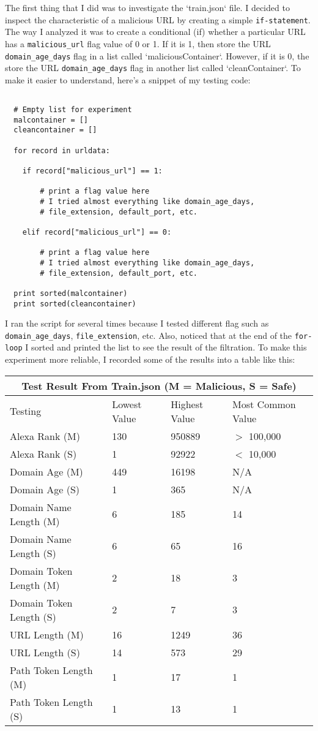 \documentclass[letterpaper,10pt,titlepage,draftclsnofoot,onecolumn]{IEEEtran}
\begin{document}
The first thing that I did was to investigate the `train.json` file.
I decided to inspect the characteristic of a malicious URL by creating a simple \verb|if-statement|.
The way I analyzed it was to create a conditional (if) whether a particular URL has a \verb|malicious_url| flag value of 0 or 1. 
If it is 1, then store the URL \verb|domain_age_days| flag in a list called `maliciousContainer`. 
However, if it is 0, the store the URL \verb|domain_age_days| flag in another list called `cleanContainer`.
To make it easier to understand, here's a snippet of my testing code:
\begin{lstlisting}
 
  # Empty list for experiment 
  malcontainer = []
  cleancontainer = []

  for record in urldata:

    if record["malicious_url"] == 1:
		
		# print a flag value here
		# I tried almost everything like domain_age_days, 
		# file_extension, default_port, etc.
		
    elif record["malicious_url"] == 0:
    
    	# print a flag value here
		# I tried almost everything like domain_age_days, 
		# file_extension, default_port, etc.

  print sorted(malcontainer)
  print sorted(cleancontainer)

\end{lstlisting}

I ran the script for several times because I tested different flag such as \verb|domain_age_days|, \verb|file_extension|, etc. 
Also, noticed that at the end of the \verb|for-loop| I sorted and printed the list to see the result of the filtration.  
To make this experiment more reliable, I recorded some of the results into a table like this: 

\begin{tabular}{ |p{4cm}|p{2cm}|p{2cm}|p{3cm}|  }
 \hline
 \multicolumn{4}{|c|}{Test Result From Train.json (M = Malicious, S = Safe)} \\
 \hline
 Testing & Lowest Value & Highest Value & Most Common Value\\
 \hline 
Alexa Rank (M) & 130 & 950889 & $>$ 100,000 \\
Alexa Rank (S) &	1	& 92922 &	$<$ 10,000 \\
Domain Age (M)	& 449	& 16198	& N/A\\
Domain Age (S)& 1	& 365	& N/A\\
Domain Name Length (M)	& 6	& 185	& 14 \\
Domain Name Length	(S) &6	&65	&16 \\
Domain Token Length (M)	&2	&18	&3 \\
Domain Token Length (S)	&2	&7	&3 \\
URL Length	(M) &16	&1249	&36 \\
URL Length	(S) &14	&573	&29 \\
Path Token Length (M) &1	&17	&1 \\
Path Token Length (S)	&1	&13	&1 \\

 \hline
\end{tabular}
\hfill\\
\end{document}
